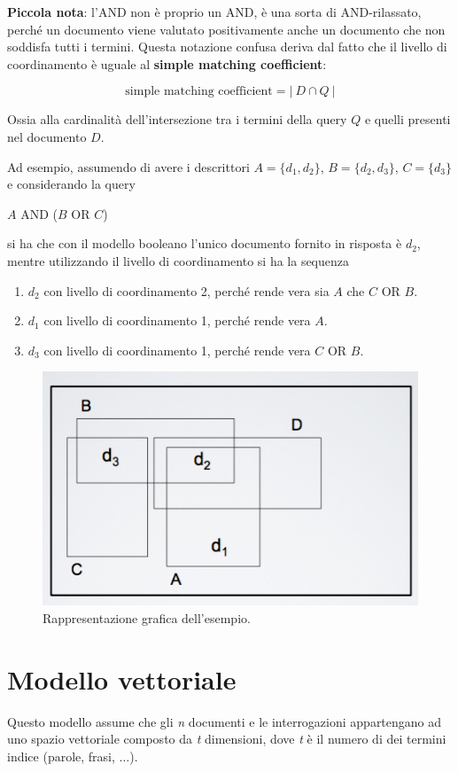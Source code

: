 \textbf{Piccola nota}: l'AND non è proprio un AND, è una sorta di AND-rilassato, perché un documento viene valutato positivamente anche un documento che non soddisfa tutti i termini. Questa notazione confusa deriva dal fatto che il livello di coordinamento è uguale al \textbf{simple matching coefficient}:

$$
\text{simple matching coefficient} = |\ D \cap Q \ |
$$

\noindent Ossia alla cardinalità dell'intersezione tra i termini della query $Q$ e quelli presenti nel documento $D$.

Ad esempio, assumendo di avere i descrittori $A = \{d_1, d_2\}$, $B = \{d_2, d_3\}$, $C =\{d_3\}$ e considerando la query

\begin{center}
	$A$ AND ($B$ OR $C$)
\end{center}

\noindent si ha che con il modello booleano l'unico documento fornito in risposta è $d_2$, mentre utilizzando il livello di coordinamento si ha la sequenza
\begin{enumerate}
	\item $d_2$ con livello di coordinamento 2, perché rende vera sia $A$ che $C$ OR $B$.
	\item $d_1$ con livello di coordinamento 1, perché rende vera $A$.
	\item $d_3$ con livello di coordinamento 1, perché rende vera $C$ OR $B$.
\end{enumerate}

\begin{figure}[htbp]
	\centering
	\includegraphics[width=0.4\linewidth]{images/l8-cord-gen}
	\caption{Rappresentazione grafica dell'esempio.}
\end{figure}

\section{Modello vettoriale}

Questo modello assume che gli \textit{n} documenti e le interrogazioni appartengano ad uno spazio vettoriale composto da \textit{t} dimensioni, dove \textit{t} è il numero di dei termini indice (parole, frasi, $\ldots$).

